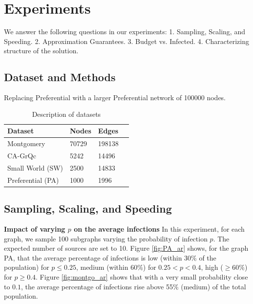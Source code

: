 \section{Experiments}
\label{sec:experiments}
We answer the following questions in our experiments:
1. Sampling, Scaling, and Speeding.
2. Approximation Guarantees.
3. Budget vs. Infected.
4. Characterizing structure of the solution.

\subsection{Dataset and Methods}
Replacing Preferential with a larger Preferential network of 100000 nodes.

\begin{table}[!h]
\centering
\begin{tabular}{llll}
\hline
 \textbf{Dataset} & \textbf{Nodes} & \textbf{Edges}   \\ \hline
 Montgomery & 70729 & 198138 \\
 CA-GrQc & 5242 & 14496\\
 Small World (SW) & 2500 & 14833 \\   
 Preferential (PA) & 1000 & 1996 \\ \hline
\end{tabular}
\caption{Description of datasets}
\label{tab:datasets}
\end{table}

\subsection{Sampling, Scaling, and Speeding}
\textbf{Impact of varying $p$ on the average infections}
In this experiment, for each graph, we sample 100 subgraphs varying the probability of infection $p$. The expected number of sources are set to 10. Figure \ref{fig:PA_ar} shows, for the graph PA, that the average percentage of infections is low (within 30\% of the population) for $p \leq 0.25$, medium (within 60\%) for $0.25 < p < 0.4$, high ($\geq 60\%$) for $p \geq 0.4$. Figure \ref{fig:montgo_ar} shows that with a very small probability close to $0.1$, the average percentage of infections rise above 55\% (medium) of the total population. 

